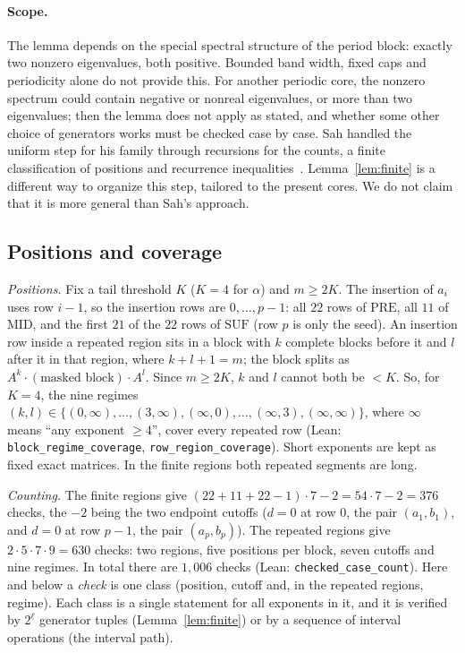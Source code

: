 \documentclass[11pt]{amsart}
\theoremstyle{definition}
\theoremstyle{remark}
\begin{document}
\paragraph{Scope.} The lemma depends on the special spectral structure of the period block: exactly two nonzero eigenvalues, both positive. Bounded band width, fixed caps and periodicity alone do not provide this. For another periodic core, the nonzero spectrum could contain negative or nonreal eigenvalues, or more than two eigenvalues; then the lemma does not apply as stated, and whether some other choice of generators works must be checked case by case. Sah handled the uniform step for his family through recursions for the counts, a finite classification of positions and recurrence inequalities~\cite{Sah21}. Lemma~\ref{lem:finite} is a different way to organize this step, tailored to the present cores. We do not claim that it is more general than Sah's approach.

\subsection*{Positions and coverage}
\emph{Positions.} Fix a tail threshold $K$ ($K=4$ for $\alpha$) and $m\ge2K$. The insertion of $a_i$ uses row $i-1$, so the insertion rows are $0,\dots,p-1$: all $22$ rows of $\mathrm{PRE}$, all $11$ of $\mathrm{MID}$, and the first $21$ of the $22$ rows of $\mathrm{SUF}$ (row $p$ is only the seed). An insertion row inside a repeated region sits in a block with $k$ complete blocks before it and $l$ after it in that region, where $k+l+1=m$; the block splits as $A^k\cdot(\text{masked block})\cdot A^l$. Since $m\ge2K$, $k$ and $l$ cannot both be $<K$. So, for $K=4$, the nine regimes $(k,l)\in\{(0,\infty),\dots,(3,\infty),(\infty,0),\dots,(\infty,3),(\infty,\infty)\}$, where $\infty$ means ``any exponent $\ge4$'', cover every repeated row (Lean: \texttt{block\_regime\_coverage}, \texttt{row\_region\_coverage}). Short exponents are kept as fixed exact matrices. In the finite regions both repeated segments are long.

\emph{Counting.} The finite regions give $(22+11+22-1)\cdot7-2=54\cdot7-2=376$ checks, the $-2$ being the two endpoint cutoffs ($d=0$ at row $0$, the pair $(a_1,b_1)$, and $d=0$ at row $p-1$, the pair $(a_p,b_p)$). The repeated regions give $2\cdot5\cdot7\cdot9=630$ checks: two regions, five positions per block, seven cutoffs and nine regimes. In total there are $1{,}006$ checks (Lean: \texttt{checked\_case\_count}). Here and below a \emph{check} is one class (position, cutoff and, in the repeated regions, regime). Each class is a single statement for all exponents in it, and it is verified by $2^\ell$ generator tuples (Lemma~\ref{lem:finite}) or by a sequence of interval operations (the interval path).
\end{document}
